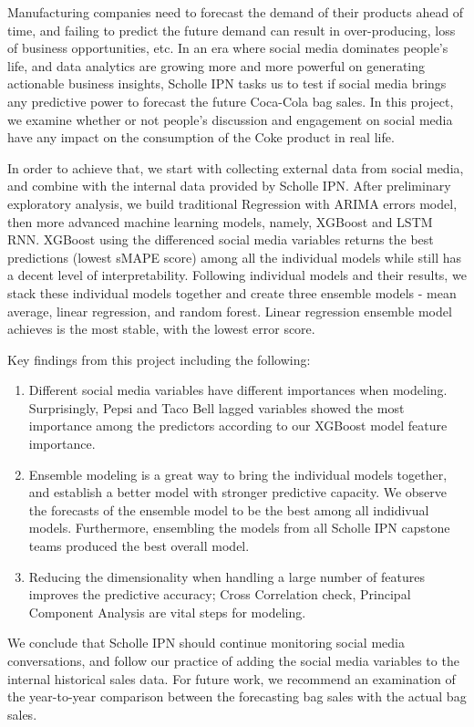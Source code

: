 \documentclass[12pt,oneside]{chicagocapstone}
\providecommand{\tightlist}{%
  \setlength{\itemsep}{0pt}\setlength{\parskip}{0pt}}
\def\labelenumi{\arabic{enumi}.}
\begin{document}
  \begin{executive}
    Manufacturing companies need to forecast the demand of their products ahead of time, and failing to predict the future demand can result in over-producing, loss of business opportunities, etc. In an era where social media dominates people's life, and data analytics are growing more and more powerful on generating actionable business insights, Scholle IPN tasks us to test if social media brings any predictive power to forecast the future Coca-Cola bag sales. In this project, we examine whether or not people's discussion and engagement on social media have any impact on the consumption of the Coke product in real life.
    
    In order to achieve that, we start with collecting external data from social media, and combine with the internal data provided by Scholle IPN. After preliminary exploratory analysis, we build traditional Regression with ARIMA errors model, then more advanced machine learning models, namely, XGBoost and LSTM RNN. XGBoost using the differenced social media variables returns the best predictions (lowest sMAPE score) among all the individual models while still has a decent level of interpretability. Following individual models and their results, we stack these individual models together and create three ensemble models - mean average, linear regression, and random forest. Linear regression ensemble model achieves is the most stable, with the lowest error score.
    
    Key findings from this project including the following:
    \begin{enumerate}
    \def\labelenumi{\arabic{enumi}.}
    \tightlist
    \item
      Different social media variables have different importances when modeling. Surprisingly, Pepsi and Taco Bell lagged variables showed the most importance among the predictors according to our XGBoost model feature importance.
    \item
      Ensemble modeling is a great way to bring the individual models together, and establish a better model with stronger predictive capacity. We observe the forecasts of the ensemble model to be the best among all indidivual models. Furthermore, ensembling the models from all Scholle IPN capstone teams produced the best overall model.
    \item
      Reducing the dimensionality when handling a large number of features improves the predictive accuracy; Cross Correlation check, Principal Component Analysis are vital steps for modeling.
    \end{enumerate}
    We conclude that Scholle IPN should continue monitoring social media conversations, and follow our practice of adding the social media variables to the internal historical sales data. For future work, we recommend an examination of the year-to-year comparison between the forecasting bag sales with the actual bag sales.\\
  \end{executive}
\end{document}
